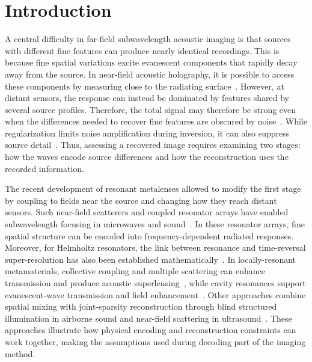 \documentclass[lineno,pdflatex,sn-nature]{sn-jnl}%
\theoremstyle{thmstyleone}%
\theoremstyle{thmstyletwo}%
\theoremstyle{thmstylethree}%
\begin{document}

\maketitle

\section{Introduction}

A central difficulty in far-field subwavelength acoustic imaging is that sources with different fine features can produce nearly identical recordings. This is because fine spatial variations excite evanescent components that rapidly decay away from the source. In near-field acoustic holography, it is possible to access these components by measuring close to the radiating surface~\cite{maynard1985,williams1999}. However, at distant sensors, the response can instead be dominated by features shared by several source profiles. Therefore, the total signal may therefore be strong even when the differences needed to recover fine features are obscured by noise~\cite{kim2003}. While regularization limits noise amplification during inversion, it can also suppress source detail~\cite{williams2001,hansen2010}. Thus, assessing a recovered image requires examining two stages: how the waves encode source differences and how the reconstruction uses the recorded information.

The recent development of resonant metalenses allowed to modify the first stage by coupling to fields near the source and changing how they reach distant sensors. Such near-field scatterers and coupled resonator arrays have enabled subwavelength focusing in microwaves and sound~\cite{lerosey2007,lemoult2010,lemoult2011prl}. In these resonator arrays, fine spatial structure can be encoded into frequency-dependent radiated responses. Moreover, for Helmholtz resonators, the link between resonance and time-reversal super-resolution has also been established mathematically~\cite{ammari2015}. In locally-resonant metamaterials, collective coupling and multiple scattering can enhance transmission and produce acoustic superlensing~\cite{yang2015,kaina2015}, while cavity resonances support evanescent-wave transmission and field enhancement~\cite{zhu2011,cheng2013,chen2021,yuan2021}. Other approaches combine spatial mixing with joint-sparsity reconstruction through blind structured illumination in airborne sound and near-field scattering in ultrasound~\cite{lin2022blind,lin2025blind}. These approaches illustrate how physical encoding and reconstruction constraints can work together, making the assumptions used during decoding part of the imaging method.
\end{document}
